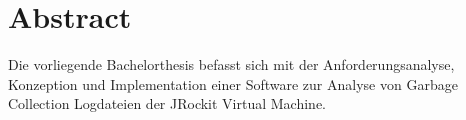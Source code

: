 \chapter*{Abstract}
Die vorliegende Bachelorthesis befasst sich mit der Anforderungsanalyse, Konzeption und Implementation einer Software zur Analyse von Garbage Collection Logdateien der JRockit Virtual Machine.